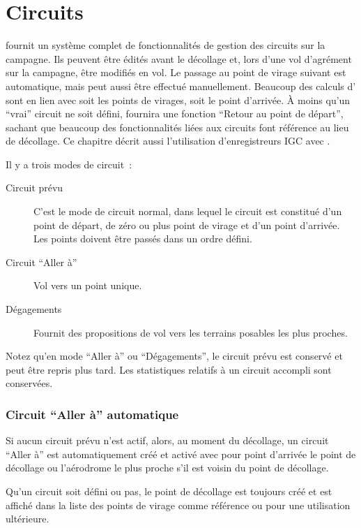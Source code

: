 
\chapter{Circuits}\label{cha:tasks}

\xc{} fournit un système complet de fonctionnalités de gestion des circuits sur la campagne. Ils peuvent être
édités avant le décollage et, lors d'une vol d'agrément
sur la campagne, être modifiés en vol. Le passage au point de virage suivant est automatique,
mais peut aussi être effectué manuellement. Beaucoup des calculs d'\xc{} sont en lien avec
soit les points de virages, soit le point d'arrivée.
À moins qu'un ``vrai'' circuit ne soit défini, \xc{} fournira une fonction ``Retour au point de départ'',
sachant que beaucoup des fonctionnalités liées aux circuits font référence au lieu de décollage.
Ce chapitre décrit aussi l'utilisation d'enregistreurs IGC avec \xc.

Il y a trois modes de circuit~:
\begin{description}
\item[Circuit prévu] C'est le mode de circuit normal,
dans lequel le circuit est constitué d'un point de départ, de zéro ou plus point de virage
et d'un point d'arrivée. Les points doivent être passés dans un ordre défini.
\item[Circuit ``Aller à''] Vol vers un point unique.
\item[Dégagements] Fournit des propositions de vol vers les  terrains posables les plus proches.
\end{description}

Notez qu'en mode ``Aller à'' ou ``Dégagements'', le circuit prévu est conservé et peut être repris plus tard.
Les statistiques relatifs à un circuit accompli sont conservées.

\subsection*{Circuit ``Aller à'' automatique}

Si aucun circuit prévu n'est actif, alors, au moment du décollage, un circuit ``Aller à'' est automatiquement
créé et activé avec pour point d'arrivée le point de décollage ou l'aérodrome le plus proche
s'il est voisin du point de décollage.

Qu'un circuit soit défini ou pas, le point de décollage est toujours
créé et est affiché dans la liste des points de virage comme référence ou pour une utilisation ultérieure.

